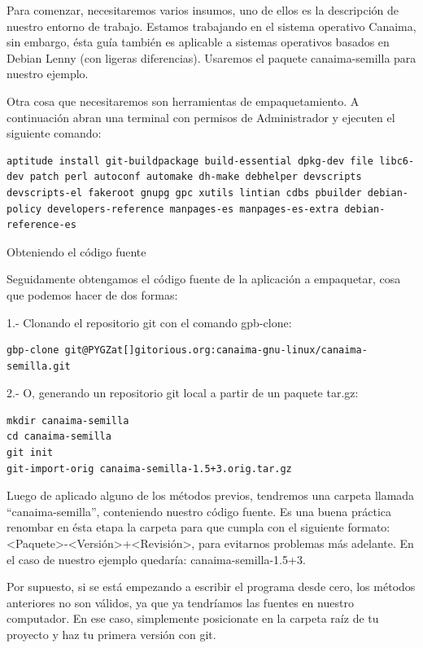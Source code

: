 \documentclass[letterpaper,12pt,spanish]{manual}
\begin{document}
Para comenzar, necesitaremos varios insumos, uno de ellos es la descripción de nuestro entorno de trabajo. Estamos trabajando en el sistema operativo Canaima, sin embargo, ésta guía también es aplicable a sistemas operativos basados en Debian Lenny (con ligeras diferencias). Usaremos el paquete canaima-semilla para nuestro ejemplo.

Otra cosa que necesitaremos son herramientas de empaquetamiento. A continuación abran una terminal con permisos de Administrador y ejecuten el siguiente comando:

\begin{Verbatim}[commandchars=@\[\]]
aptitude install git-buildpackage build-essential dpkg-dev file libc6-dev patch perl autoconf automake dh-make debhelper devscripts devscripts-el fakeroot gnupg gpc xutils lintian cdbs pbuilder debian-policy developers-reference manpages-es manpages-es-extra debian-reference-es
\end{Verbatim}

Obteniendo el código fuente

Seguidamente obtengamos el código fuente de la aplicación a empaquetar, cosa que podemos hacer de dos formas:

1.- Clonando el repositorio git con el comando gpb-clone:

\begin{Verbatim}[commandchars=@\[\]]
gbp-clone git@PYGZat[]gitorious.org:canaima-gnu-linux/canaima-semilla.git
\end{Verbatim}

2.- O, generando un repositorio git local a partir de un paquete tar.gz:

\begin{Verbatim}[commandchars=@\[\]]
mkdir canaima-semilla
cd canaima-semilla
git init
git-import-orig canaima-semilla-1.5+3.orig.tar.gz
\end{Verbatim}

Luego de aplicado alguno de los métodos previos, tendremos una carpeta llamada “canaima-semilla”, conteniendo nuestro código fuente. Es una buena práctica renombar en ésta etapa la carpeta para que cumpla con el siguiente formato: \textless{}Paquete\textgreater{}-\textless{}Versión\textgreater{}+\textless{}Revisión\textgreater{}, para evitarnos problemas más adelante. En el caso de nuestro ejemplo quedaría: canaima-semilla-1.5+3.

Por supuesto, si se está empezando a escribir el programa desde cero, los métodos anteriores no son válidos, ya que ya tendríamos las fuentes en nuestro computador. En ese caso, simplemente posicionate en la carpeta raíz de tu proyecto y haz tu primera versión con git.
\end{document}
